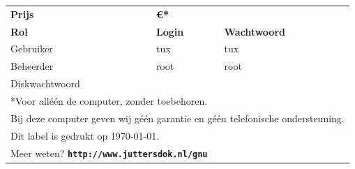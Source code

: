\documentclass[a4paper,14pt]{extarticle}
\begin{document}
\begin{center}
\begin{tabular}{ p{4cm} p{4cm}l }
	{\LARGE \bf Prijs} & \multicolumn{2}{l}{\LARGE \bf \euro{}{\price{}*}}        \\[1.5em] 
	\textbf{Rol}       & \textbf{Login} & \textbf{Wachtwoord}                     \\
	Gebruiker          & tux            & tux                                     \\
	Beheerder          & root					  & root                                    \\[2em]
	Diskwachtwoord     & \multicolumn{2}{l}{\diskpassword}                        \\[2em]
	\multicolumn{3}{l}{*Voor all\'e\'en de computer, zonder toebehoren.}          \\
	\multicolumn{3}{l}{Bij deze computer geven wij g\'e\'en garantie en g\'e\'en telefonische ondersteuning.}\\
	\multicolumn{3}{l}{\small{Dit label is gedrukt op \today.}}\\[1.5em]
	\multicolumn{3}{l}{Meer weten? \textbf{\texttt{http://www.juttersdok.nl/gnu}}}\\
\end{tabular}
\end{center}
\end{document}

